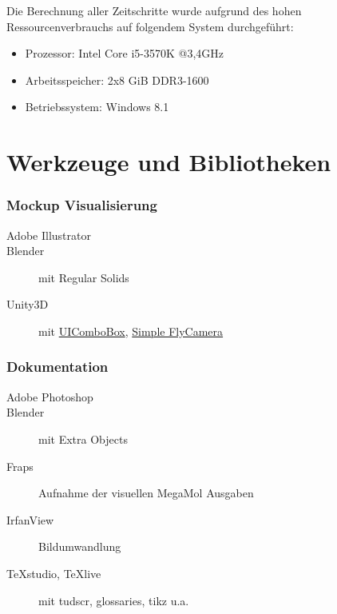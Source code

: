 Die Berechnung aller Zeitschritte wurde aufgrund des hohen Ressourcenverbrauchs auf folgendem System durchgeführt:
\begin{itemize}
	\item Prozessor: Intel Core i5-3570K @3,4GHz
	\item Arbeitsspeicher: 2x8 \gls{GiB} DDR3-1600
	\item Betriebssystem: Windows 8.1
\end{itemize}

\section{Werkzeuge und Bibliotheken}\label{sec:werkzeuge}

\subsubsection{Mockup Visualisierung}
\begin{description}
	\item [Adobe Illustrator]
	\item [Blender] mit Regular Solids
	\item [Unity3D] mit \href{http://forum.unity3d.com/threads/a-working-stylable-combo-box-drop-down-list.264167/}{UIComboBox}, \href{http://forum.unity3d.com/threads/fly-cam-simple-cam-script.67042/}{Simple FlyCamera} 
\end{description}

\subsubsection{Dokumentation}
\begin{description}
	\item [Adobe Photoshop]
	\item [Blender] mit Extra Objects
	\item [Fraps] Aufnahme der visuellen MegaMol Ausgaben
	\item [IrfanView] Bildumwandlung
	\item [TeXstudio, TeXlive] mit tudscr, glossaries, tikz u.a.
\end{description}

